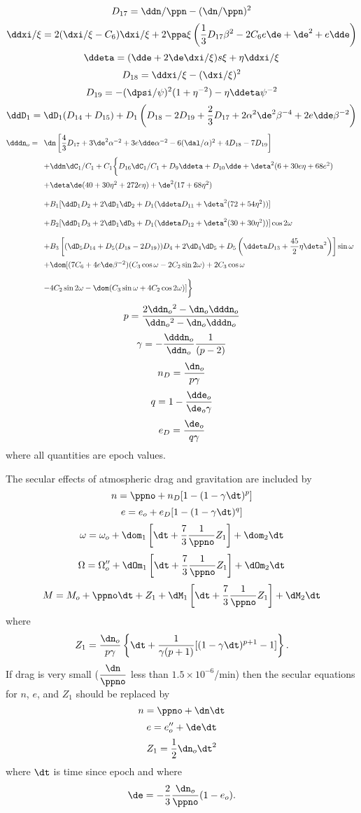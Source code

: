 \[D_{17}=\ddn/\ppn-(\dn/\ppn)^2\]
\[\ddxi/\xi=2(\dxi/\xi-C_6)\dxi/\xi+2\ppa\xi\left(\dfrac13D_{17}\beta^2-2C_6e\de+\de^2+e\dde\right)\]
\[\ddeta=(\dde+2\de\dxi/\xi)s\xi+\eta\ddxi/\xi\]
\[D_{18}=\ddxi/\xi-(\dxi/\xi)^2\]
\[D_{19}=-(\dpsi/\psi)^2(1+\eta^{-2})-\eta\ddeta\psi^{-2}\]
\[\ddD_1=\dD_1(D_{14}+D_{15})+D_1\left(D_{18}-2D_{19}
+\dfrac23D_{17}+2\alpha^2\de^2\beta^{-4}+2e\dde\beta^{-2}\right)\]
\[\dddn_o=\begin{array}[t]{l}
\dn\left[\dfrac43D_{17}+3\de^2\alpha^{-2}+3e\dde\alpha^{-2}
-6(\dal/\alpha)^2+4D_{18}-7D_{19}\right]\\[12pt]
+\ddn\dC_1/C_1+C_1\biggl\{D_{16}\dC_1/C_1+D_9\ddeta+D_{10}\dde+\deta^2(6+30e\eta+68e^2)\\[12pt]
+\deta\de(40+30\eta^2+272e\eta)+\de^2(17+68\eta^2)\\[12pt]
+B_1[\ddD_1D_2+2\dD_1\dD_2+D_1(\ddeta D_{11}+\deta^2(72+54\eta^2))]\\[12pt]
+B_2[\ddD_1D_3+2\dD_1\dD_3+D_1(\ddeta D_{12}+\deta^2(30+30\eta^2))]\cos 2\omega\\[12pt]
+B_3\left[(\dD_5D_{14}+D_5(D_{18}-2D_{19}))D_4+2\dD_4\dD_5+D_5\left(\ddeta D_{13}+\dfrac{45}2\eta\deta^2\right)\right]\sin\omega\\[12pt]
+\dom[(7C_6+4e\de\beta^{-2})(C_3\cos\omega-2C_2\sin 2\omega)+2C_3\cos\omega\\[12pt]
-4C_2\sin 2\omega-\dom(C_3\sin\omega+4C_2\cos 2\omega)]\biggr\}
\end{array}\]
\[p=\dfrac{2\ddn_o{}^2-\dn_o\dddn_o}{\ddn_o{}^2-\dn_o\dddn_o}\]
\[\gamma=-\dfrac{\dddn_o}{\ddn_o}\dfrac1{(p-2)}\]
\[n_D=\dfrac{\dn_o}{p\gamma}\]
\[q=1-\dfrac{\dde_o}{\de_o\gamma}\]
\[e_D=\dfrac{\de_o}{q\gamma}\]
where all quantities are epoch values.

The secular effects of atmospheric drag and gravitation are included by
\[n=\ppno+n_D[1-(1-\gamma\dt)^p]\]
\[e=e_o+e_D[1-(1-\gamma\dt)^q]\]
\[\omega=\omega_o+\dom_1\left[\dt+\dfrac73\dfrac1{\ppno}Z_1\right]+\dom_2\dt\]
\[\Omega=\Omega_o''+\dOm_1\left[\dt+\dfrac73\dfrac1{\ppno}Z_1\right]+\dOm_2\dt\]
\[M=M_o+\ppno\dt+Z_1+\dM_1\left[\dt+\dfrac73\dfrac1{\ppno}Z_1\right]+\dM_2\dt\]
where
\[Z_1=\dfrac{\dn_o}{p\gamma}\left\{\dt+\dfrac1{\gamma(p+1)}[(1-\gamma\dt)^{p+1}-1]\right\}.\]
If drag is very small ($\dfrac{\dn}{\ppno }$ less than $1.5 \times 10^{-6}$/min) then the
secular equations for $n$, $e$, and $Z_1$ should be replaced by
\[n=\ppno+\dn\dt\]
\[e=e''_o+\de\dt\]
\[Z_1=\dfrac12\dn_o\dt^2\]
where $\dt$ is time since epoch and where
\[\de=-\dfrac23\dfrac{\dn_o}{\ppno}(1-e_o).\]

